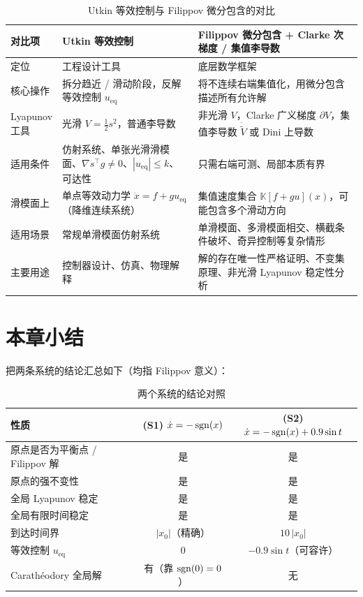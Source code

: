 \begin{table}[!htp]
  \centering
  \small
  \begin{tabular}{|p{6.5em}|p{16.8em}|p{16.8em}|}
    \hline
    \textbf{对比项} & \textbf{Utkin 等效控制} & \textbf{Filippov 微分包含 + Clarke 次梯度 / 集值李导数} \\
    \hline
    定位 & 工程设计工具 & 底层数学框架 \\
    \hline
    核心操作 & 拆分趋近 / 滑动阶段，反解等效控制 $u_\mathrm{eq}$ & 将不连续右端集值化，用微分包含描述所有允许解 \\
    \hline
    \makecell[l]{Lyapunov\\工具} & 光滑 $V=\tfrac12 s^2$，普通李导数 & 非光滑 $V$，Clarke 广义梯度 $\partial V$，集值李导数 $\dot{\tilde V}$ 或 Dini 上导数 \\
    \hline
    适用条件 & 仿射系统、单张光滑滑模面、$\nabla s^\top g\neq0$、$|u_\mathrm{eq}|\le k$、可达性 & 只需右端可测、局部本质有界 \\
    \hline
    滑模面上 & 单点等效动力学 $\dot x = f + g u_\mathrm{eq}$（降维连续系统） & 集值速度集合 $\mathbb{K}[f+gu](x)$，可能包含多个滑动方向 \\
    \hline
    适用场景 & 常规单滑模面仿射系统 & 单滑模面、多滑模面相交、横截条件破坏、奇异控制等复杂情形 \\
    \hline
    主要用途 & 控制器设计、仿真、物理解释 & 解的存在唯一性严格证明、不变集原理、非光滑 Lyapunov 稳定性分析 \\
    \hline
  \end{tabular}
  \caption{Utkin 等效控制与 Filippov 微分包含的对比}
  \label{tab:utkin-vs-filippov}
\end{table}

\section{本章小结}\label{sec:case-summary}

把两条系统的结论汇总如下（均指 Filippov 意义）：

\begin{table}[!htb]
  \centering
  \small
  \begin{tabular}{@{}p{5cm}|c|c@{}}
    \hline
    性质 & (S1) $\dot x=-\operatorname{sgn}(x)$ & (S2) $\dot x=-\operatorname{sgn}(x)+0.9\sin t$ \\
    \hline
    原点是否为平衡点 / Filippov 解 & 是 & 是 \\
    \hline
    原点的强不变性 & 是 & 是 \\
    \hline
    全局 Lyapunov 稳定 & 是 & 是 \\
    \hline
    全局有限时间稳定 & 是 & 是 \\
    \hline
    到达时间界 & $|x_0|$（精确） & $10\,|x_0|$ \\
    \hline
    等效控制 $u_\mathrm{eq}$ & $0$ & $-0.9\sin t$（可容许） \\
    \hline
    Carathéodory 全局解 & 有（靠 $\operatorname{sgn}(0)=0$） & 无 \\
    \hline
  \end{tabular}
  \caption{两个系统的结论对照}
  \label{tab:case-conclusions}
\end{table}

